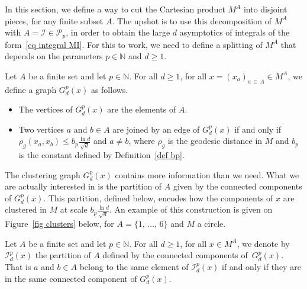 \documentclass[AHL,Unicode,longabstracts,published]{cedram}
\newcommand{\I}{\mathcal{I}}
\newcommand{\pa}{\mathcal{P}\!}
\newcommand{\N}{\mathbb{N}}
\renewcommand{\geq}{\geqslant}
\renewcommand{\leq}{\leqslant}
\begin{document}
In this section, we define a way to cut the Cartesian product $M^A$ into disjoint pieces, for any finite subset $A$. The upshot is to use this decomposition of $M^A$ with $A = \I \in \pa_p$, in order to obtain the large $d$ asymptotics of integrals of the form~\eqref{eq integral MI}. For this to work, we need to define a splitting of $M^A$ that depends on the parameters $p \in \N$ and $d \geq 1$.

\begin{defi}\label{def Gdp}
Let $A$ be a finite set and let $p \in \N$. For all $d \geq 1$, for all $x =(x_a)_{a\,\in\,A} \in M^A$, we define a graph $G^p_d(x)$ as follows.
\begin{itemize}
\item The vertices of $G^p_d(x)$ are the elements of $A$.
\item Two vertices $a$ and $b \in A$ are joined by an edge of $G^p_d(x)$ if and only if $\rho_g(x_a,x_b) \leq b_p \frac{\ln d}{\sqrt{d}}$ and $a \neq b$, where $\rho_g$ is the geodesic distance in $M$ and $b_p$ is the constant defined by Definition~\ref{def bp}.
\end{itemize}
\end{defi}

The clustering graph $G^p_d(x)$ contains more information than we need. What we are actually interested in is the partition of $A$ given by the connected components of $G^p_d(x)$. This partition, defined below, encodes how the components of $x$ are clustered in $M$ at scale $b_p\tfrac{\ln d}{\sqrt{d}}$. An example of this construction is given on Figure~\ref{fig clusters} below, for $A = \{1,\,\dots,\,6\}$ and $M$ a circle.

\begin{defi}\label{def Idp}
Let $A$ be a finite set and let $p \in \N$. For all $d \geq 1$, for all $x \in M^A$, we denote by $\I_d^p(x)$ the partition of $A$ defined by the connected components of~$G_d^p(x)$. That is $a$ and $b \in A$ belong to the same element of $\I_d^p(x)$ if and only if they are in the same connected component of $G_d^p(x)$.
\end{defi}

\usetikzlibrary{graphs}
\usetikzlibrary{arrows}
\end{document}
